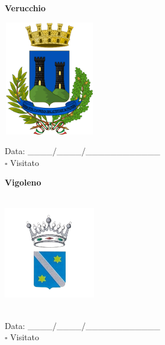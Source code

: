 \documentclass[a5paper,12pt]{article}
\begin{document}
\vspace{0.7cm}

\noindent
\begin{minipage}[t]{0.45\textwidth}
    \begin{center}
        \textbf{Verucchio}
    \end{center}
    \vspace{-0.5cm} %
    \begin{center}
        \includegraphics[height= 5cm, width=4cm]{Emilia Romagna/Stemma Verucchio.png}
    \end{center}
    \vspace{-0.4cm} %
    \begin{flushleft}
        Data: \_\_\_\_/\_\_\_\_/\_\_\_\_\_\_\_\_\_\_\_\_ \\
        $\square$ Visitato
    \end{flushleft}
\end{minipage}
\hfill
\noindent
\begin{minipage}[t]{0.45\textwidth}
    \begin{center}
        \textbf{Vigoleno}
    \end{center}
    \vspace{-0.5cm} %
    \begin{center}
        \includegraphics[height= 5cm, width=4cm]{Emilia Romagna/Stemma Vigoleno.png}
    \end{center}
    \vspace{-0.4cm} %
    \begin{flushleft}
        Data: \_\_\_\_/\_\_\_\_/\_\_\_\_\_\_\_\_\_\_\_\_ \\
        $\square$ Visitato
    \end{flushleft}
\end{minipage}
\hfill
\end{document}
